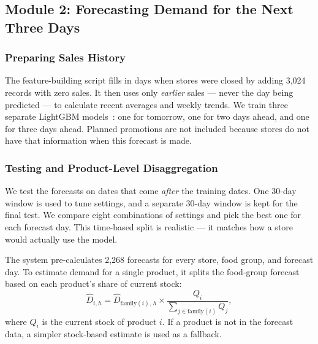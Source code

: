 \documentclass[12pt,a4paper]{article}
\renewcommand{\_}{\oldunderscore\allowbreak}
\begin{document}
\subsection{Module 2: Forecasting Demand for the Next Three Days}
\label{sec:forecast_method}

\subsubsection{Preparing Sales History}
The feature-building script fills in days when stores were closed by adding 3,024 records with zero sales. It then uses only \emph{earlier} sales --- never the day being predicted --- to calculate recent averages and weekly trends. We train three separate LightGBM models~\cite{ke2017lightgbm}: one for tomorrow, one for two days ahead, and one for three days ahead. Planned promotions are not included because stores do not have that information when this forecast is made.

\subsubsection{Testing and Product-Level Disaggregation}
We test the forecasts on dates that come \emph{after} the training dates. One 30-day window is used to tune settings, and a separate 30-day window is kept for the final test. We compare eight combinations of settings and pick the best one for each forecast day. This time-based split is realistic --- it matches how a store would actually use the model.

The system pre-calculates 2,268 forecasts for every store, food group, and forecast day. To estimate demand for a single product, it splits the food-group forecast based on each product's share of current stock:
\begin{equation}
    \hat{D}_{i, h} = \hat{D}_{\text{family}(i),\, h} \times \frac{Q_i}{\sum_{j \in \text{family}(i)} Q_j},
\end{equation}
where $Q_i$ is the current stock of product $i$. If a product is not in the forecast data, a simpler stock-based estimate is used as a fallback.
\end{document}
